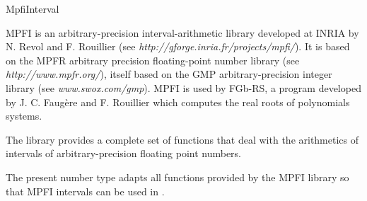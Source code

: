 %
%
%
%
% 
%

\begin{ccPkgDescription}{MpfiInterval \label{MpfiInterval}}

MPFI is an arbitrary-precision interval-arithmetic library developed at INRIA
by N. Revol and F. Rouillier
(see \emph{http://gforge.inria.fr/projects/mpfi/}).
It is based on the MPFR arbitrary precision floating-point number library (see
\emph{http://www.mpfr.org/}), itself based on the GMP arbitrary-precision
integer library (see \emph{www.swox.com/gmp}).
MPFI is used by FGb-RS, a program developed by J. C. Faug\`ere and F. Rouillier
which computes the real roots of polynomials systems.

The library provides a complete set of functions that deal with the arithmetics
of intervals of arbitrary-precision floating point numbers.

The present number type adapts all functions provided by the MPFI library so
that MPFI intervals can be used in {\cgal}.


\end{ccPkgDescription}
